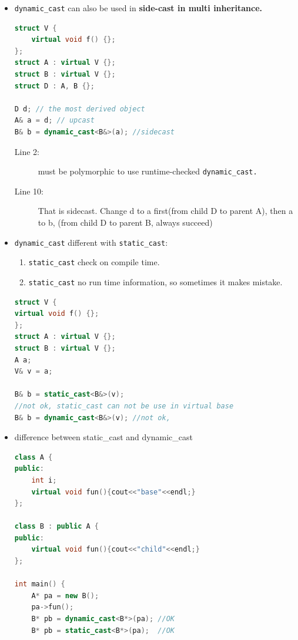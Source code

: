 \documentclass[a4paper,11pt,twoside]{book}
\begin{document}
\begin{itemize}
	
	\item \texttt{dynamic\_cast} can also be used in \textbf{side-cast in multi inheritance. }
\begin{lstlisting}[frame=single, language=c++, mathescape=true]
struct V {
	virtual void f() {};
};
struct A : virtual V {};
struct B : virtual V {};
struct D : A, B {};
	
D d; // the most derived object
A& a = d; // upcast 
B& b = dynamic_cast<B&>(a); //sidecast
	\end{lstlisting}
\begin{description}
	\item[Line 2:] must be polymorphic to use runtime-checked \texttt{dynamic\_cast.}
	
	\item[Line 10:] That is sidecast. Change d to a first(from child D to parent A), then a to b, (from child D to parent B, always succeed)
	
\end{description}
	
	\item \texttt{dynamic\_cast} different with \texttt{static\_cast}:
	\begin{enumerate}
		\item \texttt{static\_cast} check on compile time.
		\item \texttt{static\_cast} no run time information, so sometimes it makes mistake.
	\end{enumerate}
\begin{lstlisting}[frame=single, language=c++, mathescape=true]
struct V {
virtual void f() {};
};
struct A : virtual V {};
struct B : virtual V {};
A a;
V& v = a;
	
B& b = static_cast<B&>(v); 
//not ok, static_cast can not be use in virtual base
B& b = dynamic_cast<B&>(v); //not ok, 
\end{lstlisting}

\item difference between static\_cast and dynamic\_cast 

\begin{lstlisting}[frame=single, language=c++, mathescape=true]
class A {
public:
	int i;
	virtual void fun(){cout<<"base"<<endl;}
};

class B : public A {
public:
	virtual void fun(){cout<<"child"<<endl;}
};

int main() {
	A* pa = new B();
	pa->fun();
	B* pb = dynamic_cast<B*>(pa); //OK
	B* pb = static_cast<B*>(pa);  //OK


\end{lstlisting}
\end{itemize}
\end{document}
